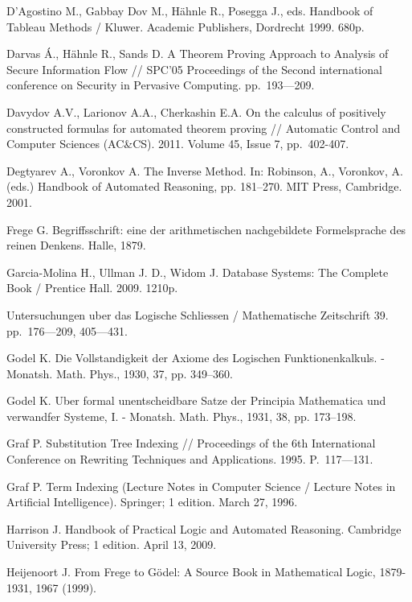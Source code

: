 \begin{thebibliography}{99}
 D'Agostino M., Gabbay Dov M., Hähnle R., Posegga J., eds. Handbook of Tableau Methods /  Kluwer. Academic Publishers, Dordrecht 1999. 680p.

 Darvas Á., Hähnle R., Sands D. A Theorem Proving Approach to Analysis of Secure Information Flow // SPC'05 Proceedings of the Second international conference on Security in Pervasive Computing. pp.~193---209.

 Davydov A.V., Larionov A.A., Cherkashin E.A. On the calculus of positively constructed formulas for automated theorem proving // Automatic Control and Computer Sciences (AC\&CS). 2011. Volume 45, Issue 7, pp.~402-407.

 Degtyarev A., Voronkov A. The Inverse Method. In: Robinson, A., Voronkov, A. (eds.) Handbook of Automated Reasoning, pp. 181--270. MIT Press, Cambridge. 2001.


 Frege G. Begriffsschrift: eine der arithmetischen nachgebildete Formelsprache des reinen Denkens. Halle, 1879.

 Garcia-Molina H., Ullman J. D., Widom J. Database Systems: The Complete Book / Prentice Hall. 2009. 1210p.

 Untersuchungen uber das Logische Schliessen / Mathematische Zeitschrift 39. pp.~176---209, 405---431. 


 Godel K. Die Vollstandigkeit der Axiome des Logischen Funktionenkalkuls. - Monatsh. Math. Phys., 1930, 37, pp. 349--360.

 Godel K. Uber formal unentscheidbare Satze der Principia Mathematica und verwandfer Systeme, I. - Monatsh. Math. Phys., 1931, 38, pp. 173--198.



 Graf P. Substitution Tree Indexing // Proceedings of the 6th International Conference on Rewriting Techniques and Applications. 1995. P.~117---131.

 Graf P. Term Indexing (Lecture Notes in Computer Science / Lecture Notes in Artificial Intelligence). Springer; 1 edition. March 27, 1996.

 Harrison J. Handbook of Practical Logic and Automated Reasoning. Cambridge University Press; 1 edition. April 13, 2009.


 Heijenoort J. From Frege to Gödel: A Source Book in Mathematical Logic, 1879-1931, 1967 (1999).


\end{thebibliography}
